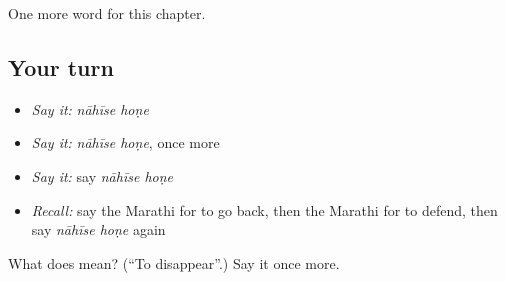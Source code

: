 \begin{grammarlens}[title={What you've built}]
One more word for this chapter.
\end{grammarlens}

\subsection*{Your turn}
\begin{itemize}
\raggedright
  \item \emph{Say it:} \emph{nāhīse hoṇe}
  \item \emph{Say it:} \emph{nāhīse hoṇe}, once more
  \item \emph{Say it:} say \emph{nāhīse hoṇe}
  \item \emph{Recall:} say the Marathi for to go back, then the Marathi for to defend, then say \emph{nāhīse hoṇe} again
\end{itemize}

\begin{tcolorbox}[breakable,colback=teal!4,colframe=teal!35!black,title={Before you move on}]
What does   mean? (\textquotedblleft{}To disappear\textquotedblright{}.) Say it once more.
\end{tcolorbox}
